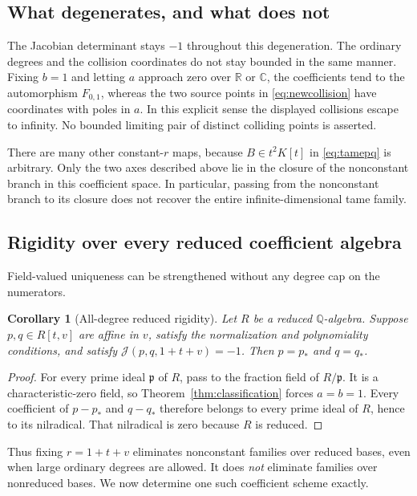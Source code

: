 \documentclass[11pt,a4paper]{article}
\numberwithin{equation}{section}
\newtheorem{corollary}[theorem]{Corollary}
\theoremstyle{definition}
\theoremstyle{remark}
\newcommand{\Q}{\mathbb{Q}}
\newcommand{\J}{\mathcal{J}}
\begin{document}
\subsection{What degenerates, and what does not}

The Jacobian determinant stays $-1$ throughout this degeneration. The
ordinary degrees and the collision coordinates do not stay bounded in the
same manner. Fixing $b=1$ and letting $a$ approach zero over $\mathbb R$ or
$\mathbb C$, the coefficients tend to the automorphism $F_{0,1}$, whereas
the two source points in \eqref{eq:newcollision} have coordinates with
poles in $a$. In this explicit sense the displayed collisions escape to
infinity. No bounded limiting pair of distinct colliding points is asserted.

There are many other constant-$r$ maps, because $B\in t^2K[t]$ in
\eqref{eq:tamepq} is arbitrary. Only the two axes described above lie in the
closure of the nonconstant branch in this coefficient space. In particular,
passing from the nonconstant branch to its closure does not recover the
entire infinite-dimensional tame family.

\subsection{Rigidity over every reduced coefficient algebra}

Field-valued uniqueness can be strengthened without any degree cap on the
numerators.

\begin{corollary}[All-degree reduced rigidity]\label{cor:reduced}
Let $R$ be a reduced $\Q$-algebra. Suppose $p,q\in R[t,v]$ are affine in
$v$, satisfy the normalization and polynomiality conditions, and satisfy
$\J(p,q,1+t+v)=-1$. Then $p=p_*$ and $q=q_*$.
\end{corollary}
\begin{proof}
For every prime ideal $\mathfrak p$ of $R$, pass to the fraction field of
$R/\mathfrak p$. It is a characteristic-zero field, so
Theorem~\ref{thm:classification} forces $a=b=1$. Every coefficient of
$p-p_*$ and $q-q_*$ therefore belongs to every prime ideal of $R$, hence to
its nilradical. That nilradical is zero because $R$ is reduced.
\end{proof}

Thus fixing $r=1+t+v$ eliminates nonconstant families over reduced bases,
even when large ordinary degrees are allowed. It does \emph{not} eliminate
families over nonreduced bases. We now determine one such coefficient
scheme exactly.
\end{document}

